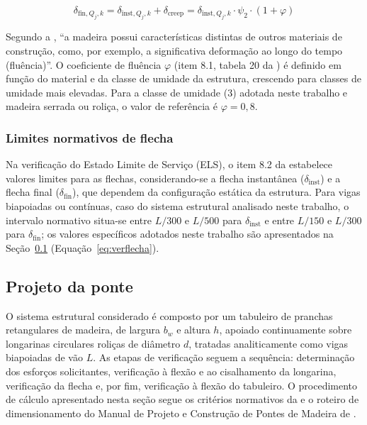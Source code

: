 \begin{equation}
\delta_{\mathrm{fin},Q_j,k}
=
\delta_{\mathrm{inst},Q_j,k}
+ \delta_{\mathrm{creep}}
=
\delta_{\mathrm{inst},Q_j,k} \cdot \psi_{2} \cdot (1 + \varphi)
\label{eq:flecha_fin_Q}
\end{equation}

Segundo a \textcite{NBR7190-1:2022}, ``a madeira possui características distintas de outros materiais de construção, como, por exemplo, a significativa deformação ao longo do tempo (fluência)''.
O coeficiente de fluência $\varphi$ (item 8.1, tabela 20 da \textcite{NBR7190-1:2022}) é definido em função do material e da classe de umidade da estrutura, crescendo para classes de umidade mais elevadas. Para a classe de umidade (3) adotada neste trabalho e madeira serrada ou roliça, o valor de referência é $\varphi = 0{,}8$.

\subsubsection{Limites normativos de flecha}

Na verificação do Estado Limite de Serviço (ELS), o item 8.2 da \textcite{NBR7190-1:2022} estabelece valores limites para as flechas, considerando-se a flecha instantânea ($\delta_{\mathrm{inst}}$) e a flecha final ($\delta_{\mathrm{fin}}$), que dependem da configuração estática da estrutura.
Para vigas biapoiadas ou contínuas, caso do sistema estrutural analisado neste trabalho, o intervalo normativo situa-se entre $L/300$ e $L/500$ para $\delta_{\mathrm{inst}}$ e entre $L/150$ e $L/300$ para $\delta_{\mathrm{fin}}$; os valores específicos adotados neste trabalho são apresentados na Seção~\ref{sec:projeto_ponte} (Equação~\eqref{eq:verflecha}).

\subsection{Projeto da ponte}\label{sec:projeto_ponte}

O sistema estrutural considerado é composto por um tabuleiro de pranchas retangulares de madeira, de largura $b_w$ e altura $h$, apoiado continuamente sobre longarinas circulares roliças de diâmetro $d$, tratadas analiticamente como vigas biapoiadas de vão $L$.
As etapas de verificação seguem a sequência: determinação dos esforços solicitantes, verificação à flexão e ao cisalhamento da longarina, verificação da flecha e, por fim, verificação à flexão do tabuleiro.
O procedimento de cálculo apresentado nesta seção segue os critérios normativos da \textcite{NBR7190-1:2022} e o roteiro de dimensionamento do Manual de Projeto e Construção de Pontes de Madeira de \textcite{CALIL2006}.

